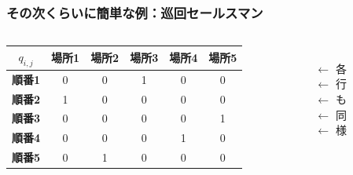 \setcounter{framenumber}{11}
\begin{frame}
  \frametitle{その次くらいに簡単な例：巡回セールスマン}
  \begin{columns}
    \begin{column}{0.9\linewidth}
      \begin{table}
        \centering
        \begin{tabular}{c|c c c c c}
            \textbf{$q_{i,j}$} & \textbf{場所1} & \textbf{場所2} & \textbf{場所3} & \textbf{場所4} & \textbf{場所5} \\
            \hline
            \rowcolor{blue!50}
            \textbf{順番1} & 0 & 0 & \color{orange}1 & 0 & 0  \\
            \textbf{順番2} & \color{orange}1 & 0 & 0 & 0 & 0  \\
            \rowcolor{blue!50}
            \textbf{順番3} & 0 & 0 & 0 & 0 & \color{orange}1  \\
            \textbf{順番4} & 0 & 0 & 0 & \color{orange}1 & 0  \\
            \rowcolor{blue!50}
            \textbf{順番5} & 0 & \color{orange}1 & 0 & 0 & 0  \\
        \end{tabular}
      \end{table}        
    \end{column}
    \begin{column}{0.3\linewidth}
      \vspace{3mm}\\
      $\leftarrow$  各\\
      $\leftarrow$  行\\
      $\leftarrow$  も\\
      $\leftarrow$  同\\
      $\leftarrow$  様
    \end{column}
  \end{columns}
  

\end{frame}

